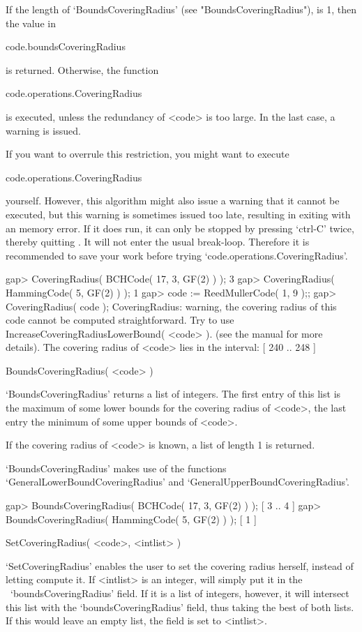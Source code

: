 If the length of `BoundsCoveringRadius' (see "BoundsCoveringRadius"),
is 1, then the value in

\begintt
code.boundsCoveringRadius
\endtt

is returned.
Otherwise, the function

\begintt
code.operations.CoveringRadius
\endtt

is executed, unless the redundancy of <code> is too large.  In  the  last
case, a warning is issued.

If you want to overrule this restriction, you might want to execute

\begintt
code.operations.CoveringRadius
\endtt

yourself. However, this algorithm might also  issue  a  warning  that  it
cannot be executed, but  this  warning  is  sometimes  issued  too  late,
resulting in {\GAP} exiting with an memory error. If it does run, it  can
only be stopped by pressing `ctrl-C' twice, thereby quitting  {\GAP}.  It
will not enter the usual break-loop. Therefore it is recommended to  save
your work before trying `code.operations.CoveringRadius'.

\beginexample
gap> CoveringRadius( BCHCode( 17, 3, GF(2) ) );
3
gap> CoveringRadius( HammingCode( 5, GF(2) ) );
1
gap> code := ReedMullerCode( 1, 9 );;
gap> CoveringRadius( code );
CoveringRadius: warning, the covering radius of
this code cannot be computed straightforward.
Try to use IncreaseCoveringRadiusLowerBound( <code> ).
(see the manual for more details).
The covering radius of <code> lies in the interval:
[ 240 .. 248 ]
\endexample

\>BoundsCoveringRadius( <code> )

`BoundsCoveringRadius' returns a list of integers.
The first entry of this list is the maximum of some lower bounds
for the covering radius of <code>,
the last entry the minimum of some upper bounds of <code>.

If the covering radius of <code> is known, a list of length 1 is
returned.

`BoundsCoveringRadius' makes use of the functions
`GeneralLowerBoundCoveringRadius' and
`GeneralUpperBoundCoveringRadius'.

\beginexample
gap> BoundsCoveringRadius( BCHCode( 17, 3, GF(2) ) );
[ 3 .. 4 ]
gap> BoundsCoveringRadius( HammingCode( 5, GF(2) ) );
[ 1 ] 
\endexample

\>SetCoveringRadius( <code>, <intlist> )

`SetCoveringRadius' enables the user to set the covering radius
herself, instead of letting {\GUAVA} compute it.
If <intlist> is an integer, {\GUAVA} will simply put it in
the \ `boundsCoveringRadius' field.
If it is a list of integers, however, it will intersect this list
with the `boundsCoveringRadius' field, thus taking the best of both
lists.
If this would leave an empty list, the field is set to <intlist>.

